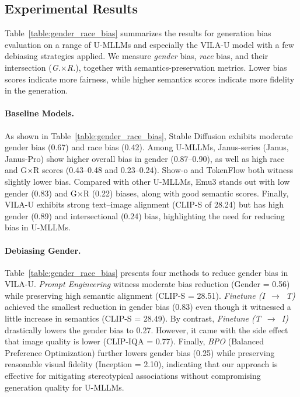 \vspace{-1em}
\subsection{Experimental Results}
\label{sec:exp_results}



Table~\ref{table:gender_race_bias} summarizes the results for generation bias evaluation on a range of U-MLLMs and especially the VILA-U model with a few debiasing strategies applied. We measure \emph{gender} bias, \emph{race} bias, and their intersection (\emph{G.$\times$R.}), together with semantics-preservation metrics. Lower bias scores indicate more fairness, while higher semantics scores indicate more fidelity in the generation.
\vspace{-1em}
\paragraph{Baseline Models.} As shown in Table~\ref{table:gender_race_bias}, Stable Diffusion exhibits moderate gender bias (0.67) and race bias (0.42). Among U-MLLMs, Janus-series (Janus, Janus-Pro) show higher overall bias in gender (0.87–0.90), as well as high race and G×R scores (0.43–0.48 and 0.23–0.24). Show-o and TokenFlow both witness slightly lower bias. Compared with other U-MLLMs, Emu3 stands out with low gender (0.83) and G×R (0.22) biases, along with good semantic scores. Finally, VILA-U exhibits strong text–image alignment (CLIP-S of 28.24) but has high gender (0.89) and intersectional (0.24) bias, highlighting the need for reducing bias in U-MLLMs.
\vspace{-1em}
\paragraph{Debiasing Gender.} Table~\ref{table:gender_race_bias} presents four methods to reduce gender bias in VILA-U. 
\emph{Prompt Engineering} witness moderate bias reduction (Gender = 0.56) while preserving high semantic alignment (CLIP-S = 28.51). 
\emph{Finetune (I~$\rightarrow$~T)} achieved the smallest reduction in gender bias (0.83) even though it witnessed a little increase in semantics (CLIP-S = 28.49). 
By contrast, \emph{Finetune (T~$\rightarrow$~I)} drastically lowers the gender bias to 0.27. However, it came with the side effect that image quality is lower (CLIP-IQA = 0.77). 
Finally, \emph{BPO} (Balanced Preference Optimization) further lowers gender bias (0.25) while preserving reasonable visual fidelity (Inception = 2.10), indicating that our approach is effective for mitigating stereotypical associations without compromising generation quality for U-MLLMs.
\vspace{-1em}
